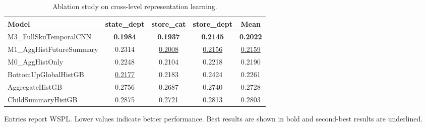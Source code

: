 \begin{table}[H]
\centering
\caption{Ablation study on cross-level representation learning.}
\label{tab:ablation}
\begin{threeparttable}
\begin{tabular}{lcccc}
\toprule
Model & state\_dept & store\_cat & store\_dept & Mean \\
\midrule
M3\_FullSkuTemporalCNN & \textbf{0.1984} & \textbf{0.1937} & \textbf{0.2145} & \textbf{0.2022} \\
M1\_AggHistFutureSummary & 0.2314 & \underline{0.2008} & \underline{0.2156} & \underline{0.2159} \\
M0\_AggHistOnly & 0.2248 & 0.2104 & 0.2218 & 0.2190 \\
BottomUpGlobalHistGB & \underline{0.2177} & 0.2183 & 0.2424 & 0.2261 \\
AggregateHistGB & 0.2756 & 0.2687 & 0.2740 & 0.2728 \\
ChildSummaryHistGB & 0.2875 & 0.2721 & 0.2813 & 0.2803 \\
\bottomrule
\end{tabular}
\begin{tablenotes}
\footnotesize \item Entries report WSPL. Lower values indicate better performance. Best results are shown in bold and second-best results are underlined.
\end{tablenotes}
\end{threeparttable}
\end{table}
